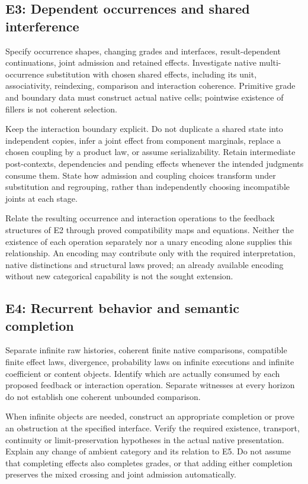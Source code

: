 \documentclass[11pt]{article}
\begin{document}
\subsection*{E3: Dependent occurrences and shared interference}
Specify occurrence shapes, changing grades and interfaces, result-dependent continuations, joint admission and retained effects. Investigate native multi-occurrence substitution with chosen shared effects, including its unit, associativity, reindexing, comparison and interaction coherence. Primitive grade and boundary data must construct actual native cells; pointwise existence of fillers is not coherent selection.

Keep the interaction boundary explicit. Do not duplicate a shared state into independent copies, infer a joint effect from component marginals, replace a chosen coupling by a product law, or assume serializability. Retain intermediate post-contexts, dependencies and pending effects whenever the intended judgments consume them. State how admission and coupling choices transform under substitution and regrouping, rather than independently choosing incompatible joints at each stage.

Relate the resulting occurrence and interaction operations to the feedback structures of E2 through proved compatibility maps and equations. Neither the existence of each operation separately nor a unary encoding alone supplies this relationship. An encoding may contribute only with the required interpretation, native distinctions and structural laws proved; an already available encoding without new categorical capability is not the sought extension.

\subsection*{E4: Recurrent behavior and semantic completion}
Separate infinite raw histories, coherent finite native comparisons, compatible finite effect laws, divergence, probability laws on infinite executions and infinite coefficient or content objects. Identify which are actually consumed by each proposed feedback or interaction operation. Separate witnesses at every horizon do not establish one coherent unbounded comparison.

When infinite objects are needed, construct an appropriate completion or prove an obstruction at the specified interface. Verify the required existence, transport, continuity or limit-preservation hypotheses in the actual native presentation. Explain any change of ambient category and its relation to E5. Do not assume that completing effects also completes grades, or that adding either completion preserves the mixed crossing and joint admission automatically.
\end{document}
